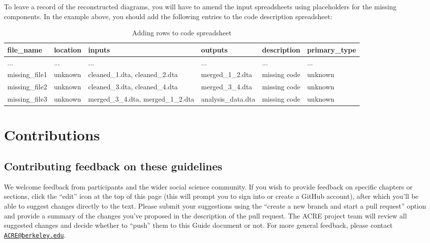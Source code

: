 \documentclass[
]{book}
\begin{document}
To leave a record of the reconstructed diagrams, you will have to amend the input spreadsheets using placeholders for the missing components. In the example above, you should add the following entries to the code description spreadsheet:

\begin{table}

\caption{\label{tab:adding-rows-extra}Adding rows to code spreadsheet}
\centering
\begin{tabu} to 
\hline
file\_name & location & inputs & outputs & description & primary\_type\\
\hline
... & ... & ... & ... & ... & ...\\
\hline
missing\_file1 & unknown & cleaned\_1.dta, cleaned\_2.dta & merged\_1\_2.dta & missing code & unknown\\
\hline
missing\_file2 & unknown & cleaned\_3.dta, cleaned\_4.dta & merged\_3\_4.dta & missing code & unknown\\
\hline
missing\_file3 & unknown & merged\_3\_4.dta, merged\_1\_2.dta & analysis\_data.dta & missing code & unknown\\
\hline
\end{tabu}
\end{table}

\hypertarget{contributions}{%
\chapter{Contributions}\label{contributions}}

\hypertarget{contrib-guide}{%
\section{Contributing feedback on these guidelines}\label{contrib-guide}}

We welcome feedback from participants and the wider social science community. If you wish to provide feedback on specific chapters or sections, click the ``edit'' icon at the top of this page (this will prompt you to sign into or create a GitHub account), after which you'll be able to suggest changes directly to the text. Please submit your suggestions using the ``create a new branch and start a pull request'' option and provide a summary of the changes you've proposed in the description of the pull request. The ACRE project team will review all suggested changes and decide whether to ``push'' them to this Guide document or not. For more general feedback, please contact \href{mailto:ACRE@berkeley.edu}{\nolinkurl{ACRE@berkeley.edu}}.
\end{document}
